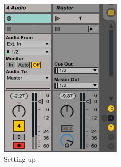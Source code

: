 \documentclass{article}
\begin{document}
\begin{enumerate}
				\begin{figure}[h!]
				  \centering
					\begin{subfigure}[b]{0.5\textwidth}
				    \includegraphics[width=\textwidth]{images/about_to_record_stereo}
					  \caption{Setting up}
					  \label{about_to_record_stereo}
					\end{subfigure}
					\qquad
					\begin{subfigure}[b]{0.3\textwidth}

\end{subfigure}
\end{figure}
\end{enumerate}
\end{document}
